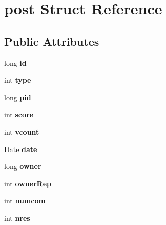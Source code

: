 \hypertarget{structpost}{}\section{post Struct Reference}
\label{structpost}
\subsection*{Public Attributes}
\begin{DoxyCompactItemize}
\item 
long {\bfseries id}\hypertarget{structpost_afcd847f54ea0504d5b4abe26a26193d8}{}\label{structpost_afcd847f54ea0504d5b4abe26a26193d8}

\item 
int {\bfseries type}\hypertarget{structpost_a401afe427297274844406cf1e960cc8a}{}\label{structpost_a401afe427297274844406cf1e960cc8a}

\item 
long {\bfseries pid}\hypertarget{structpost_ac567a00ff4a413c187bbd9849851872b}{}\label{structpost_ac567a00ff4a413c187bbd9849851872b}

\item 
int {\bfseries score}\hypertarget{structpost_a044eb6045f2d098c8573e472b74d3de4}{}\label{structpost_a044eb6045f2d098c8573e472b74d3de4}

\item 
int {\bfseries vcount}\hypertarget{structpost_a3363773a9afb3c01321346cbbc94852e}{}\label{structpost_a3363773a9afb3c01321346cbbc94852e}

\item 
Date {\bfseries date}\hypertarget{structpost_afb98618ad1f5d7f7d9477f42f3c66904}{}\label{structpost_afb98618ad1f5d7f7d9477f42f3c66904}

\item 
long {\bfseries owner}\hypertarget{structpost_a8137d52739e6eed3e67878634bd6e809}{}\label{structpost_a8137d52739e6eed3e67878634bd6e809}

\item 
int {\bfseries owner\+Rep}\hypertarget{structpost_ac0220e7222e0ab969acb93962a4325f8}{}\label{structpost_ac0220e7222e0ab969acb93962a4325f8}

\item 
int {\bfseries numcom}\hypertarget{structpost_a3c856ae1e6f7c94af347555255d3c17a}{}\label{structpost_a3c856ae1e6f7c94af347555255d3c17a}

\item 
int {\bfseries nres}\hypertarget{structpost_ac96e0f589006f9ebd919005cc02e998b}{}\label{structpost_ac96e0f589006f9ebd919005cc02e998b}


\end{DoxyCompactItemize}
